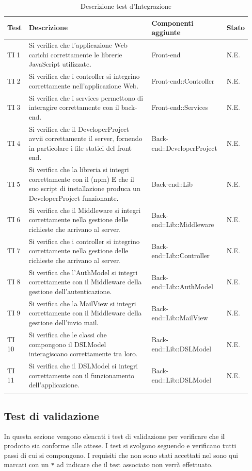 	\bgroup
	\begin{longtable}[H]{|P{1cm}|P{5cm}|P{4.5cm}|P{2cm}|}
		\hline \textbf{Test} & \textbf{Descrizione} & \textbf{Componenti aggiunte} & \textbf{Stato} \\
		
		\hline TI 1 & Si verifica che l'applicazione Web carichi correttamente le librerie JavaScript utilizzate. & Front-end & N.E. \\
		\hline TI 2 & Si verifica che i controller si integrino correttamente nell'applicazione Web. & Front-end::Controller & N.E. \\
		\hline TI 3 & Si verifica che i services permettono di interagire correttamente con il back-end. & Front-end::Services & N.E. \\
		\hline TI 4 & Si verifica che il DeveloperProject avvii correttamente il server, fornendo in particolare i file statici del front-end. & Back-end::DeveloperProject & N.E. \\
		\hline TI 5 & Si verifica che la libreria si integri correttamente con il  (npm) E che il suo script di installazione produca un DeveloperProject funzionante. & Back-end::Lib & N.E. \\
		\hline TI 6 & Si verifica che il Middleware si integri correttamente nella gestione delle richieste che arrivano al server. & Back-end::Lib::Middleware & N.E. \\
		\hline TI 7 & Si verifica che i controller si integrino correttamente nella gestione delle richieste che arrivano al server. & Back-end::Lib::Controller & N.E. \\
		\hline TI 8 & Si verifica che l'AuthModel si integri correttamente con il Middleware della gestione dell'autenticazione. & Back-end::Lib::AuthModel & N.E. \\
		\hline TI 9 & Si verifica che la MailView si integri correttamente con il Middleware della gestione dell'invio mail. & Back-end::Lib::MailView & N.E. \\
		\hline TI 10 & Si verifica che le classi che compongono il DSLModel interagiscano correttamente tra loro. & Back-end::Lib::DSLModel & N.E. \\
		\hline TI 11 & Si verifica che il DSLModel si integri correttamente con il funzionamento dell'applicazione. & Back-end::Lib::DSLModel & N.E. \\
		\hline
	\caption{Descrizione test d'Integrazione}
	\end{longtable}
	\egroup

	\subsection{Test di validazione}
	In questa sezione vengono elencati i test di validazione per verificare che il prodotto sia conforme alle attese. I test si svolgono seguendo e verificano tutti passi di cui si compongono. I requisiti che non sono stati accettati nel \AnalisiDeiRequisiti{} sono qui marcati con un \texttt{*} ad indicare che il test associato non verrà effettuato.
	
	
	
	
	
	

